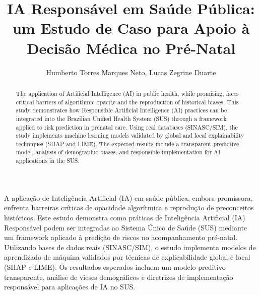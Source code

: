 \documentclass[12pt]{article}
\title{IA Responsável em Saúde Pública: um Estudo de Caso para Apoio à Decisão Médica no Pré-Natal}
\author{Humberto Torres Marques Neto\inst{1}, Lucas Zegrine Duarte\inst{2}}
\begin{document}
 

\maketitle


\begin{abstract}
  The application of Artificial Intelligence (AI) in public health, while promising, faces critical barriers of algorithmic opacity and the reproduction of historical biases. This study demonstrates how Responsible Artificial Intelligence (AI) practices can be integrated into the Brazilian Unified Health System (SUS) through a framework applied to risk prediction in prenatal care. Using real databases (SINASC/SIM), the study implements machine learning models validated by global and local explainability techniques (SHAP and LIME). The expected results include a transparent predictive model, analysis of demographic biases, and responsible implementation for AI applications in the SUS.
\end{abstract}
     
\begin{resumo} 
  A aplicação de Inteligência Artificial (IA) em saúde pública, embora promissora, enfrenta barreiras críticas de opacidade algorítmica e reprodução de preconceitos históricos. Este estudo demonstra como práticas de Inteligência Artificial (IA) Responsável podem ser integradas ao Sistema Único de Saúde (SUS) mediante um framework aplicado à predição de riscos no acompanhamento pré-natal. Utilizando bases de dados reais (SINASC/SIM), o estudo implementa modelos de aprendizado de máquina validados por técnicas de explicabilidade global e local (SHAP e LIME). Os resultados esperados incluem um modelo preditivo transparente, análise de vieses demográficos e diretrizes de implementação responsável para aplicações de IA no SUS.
\end{resumo}
\end{document}
